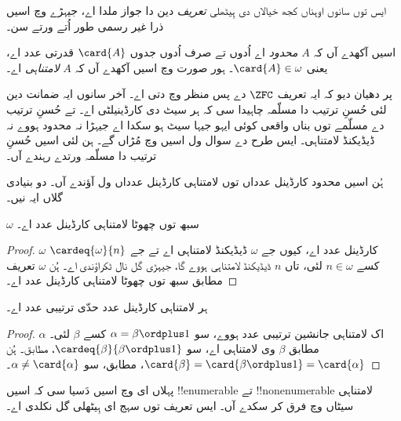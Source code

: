 \documentclass[../../../include/open-logic-section]{subfiles}
\begin{document}
ایس توں سانوں اوہناں کجھ خیالاں دی ہِیٹھلی \emph{تعریف} دین دا جواز ملدا اے، جیہڑے  وچ اسیں ذرا غیر رسمی طور اُتے ورتے سن۔

\begin{defn}
اسیں آکھدے آں کہ $A$ \emph{محدود} اے اُدوں تے صرف اُدوں جدوں $\card{A}$ قدرتی عدد اے، یعنی $\card{A} \in \omega$۔ ہور صورت وچ اسیں آکھدے آں کہ $A$ \emph{لامتناہی} اے۔
\end{defn}
\noindent
پر دھیان دیو کہ ایہ تعریف $\ZFC$ دے پس منظر وچ دتی اے۔ آخر سانوں ایہ ضمانت دین لئی حُسنِ ترتیب دا مسلّمہ چاہیدا سی کہ ہر سیٹ دی کارڈینیلٹی اے۔ تے حُسنِ ترتیب دے مسلّمے توں بناں واقعی کوئی ایہو جیہا سیٹ ہو سکدا اے جیہڑا نہ محدود ہووے نہ ڈیڈیکنڈ لامتناہی۔ ایس طرح دے سوال ول اسیں  وچ مُڑاں گے۔ ہن لئی اسیں حُسنِ ترتیب دا مسلّمہ ورتدے رہندے آں۔

ہُن اسیں محدود کارڈینل عدداں توں لامتناہی کارڈینل عدداں ول آؤندے آں۔ دو بنیادی گلاں ایہ نیں۔

\begin{cor}
$\omega$ سبھ توں چھوٹا لامتناہی کارڈینل عدد اے۔
\end{cor}

\begin{proof}
$\omega$ کارڈینل عدد اے، کیوں جے $\omega$ ڈیڈیکنڈ لامتناہی اے تے جے $\cardeq{\omega}{n}$ کسے $n \in \omega$ لئی، تاں $n$ ڈیڈیکنڈ لامتناہی ہووے گا، جیہڑی گل  نال ٹکراؤندی اے۔ ہُن $\omega$ تعریف مطابق سبھ توں چھوٹا لامتناہی کارڈینل عدد اے۔
\end{proof}

\begin{cor}
ہر لامتناہی کارڈینل عدد حدّی ترتیبی عدد اے۔
\end{cor}

\begin{proof}
$\alpha$ اک لامتناہی جانشین ترتیبی عدد ہووے، سو $\alpha = \beta
\ordplus 1$ کسے $\beta$ لئی۔  مطابق $\beta$ وی لامتناہی اے، سو $\cardeq{\beta}{\beta \ordplus 1}$،  مطابق۔ ہُن $\card{\beta} = \card{\beta\ordplus 1} = \card{\alpha}$،  مطابق، سو $\alpha \neq \card{\alpha}$۔
\end{proof}

پہلاں ای  وچ اسیں دَسیا سی کہ اسیں !!{enumerable} تے !!{nonenumerable} لامتناہی سیٹاں وچ فرق کر سکدے آں۔ ایس تعریف توں سہج ای ہِیٹھلی گل نکلدی اے۔
\end{document}
